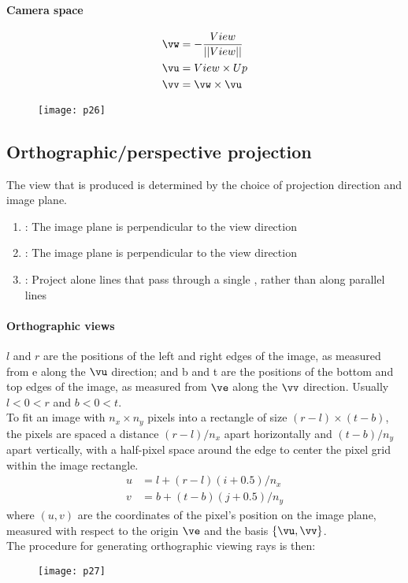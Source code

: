 \documentclass[11pt]{article}
\numberwithin{equation}{section}
\begin{document}
\paragraph{Camera space}
\begin{align}
	\vw &= -\frac{View}{||View||} \\
	\vu &= View \times Up \\
	\vv &= \vw \times \vu
\end{align}
	\begin{figure}[H]
	\centering
	\texttt{[image: p26]}
	\end{figure}

\subsection{Orthographic/perspective projection}
The view that is produced is determined by the choice of projection direction and image plane.
\begin{enumerate}
	\item {}: The image plane is perpendicular to the view direction
	\item {}: The image plane is  perpendicular to the view direction
	\item {}: Project alone lines that pass through a single , rather than along parallel lines
\end{enumerate}

\paragraph{Orthographic views}
$l$ and $r$ are the positions of the left and right edges of the image, as measured from e along the $\vu$ direction; and b and t are the positions of the bottom and top edges of the image, as measured from $\ve$ along the $\vv$ direction. Usually $l < 0 < r$ and $b < 0 < t$. \\
To fit an image with $n_x \times n_y$ pixels into a rectangle of size $(r-l) \times (t-b)$, the pixels are spaced a distance $(r - l)/n_x$ apart horizontally and $(t-b)/n_y$ apart vertically, with a half-pixel space around the edge to center the pixel grid within the image rectangle.
\begin{align}
	u &= l + (r - l)(i+0.5)/n_x \\
	v &= b + (t - b)(j+0.5)/n_y
\end{align}
where $(u, v)$ are the coordinates of the pixel's position on the image plane, measured with respect to the origin $\ve$ and the basis $\{\vu, \vv\}$.\\
The procedure for generating orthographic viewing rays is then:
	\begin{figure}[H]
	\centering
	\texttt{[image: p27]}
	\end{figure}
\end{document}

